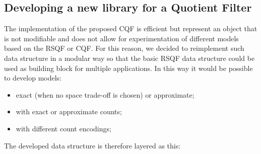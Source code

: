 \subsection{Developing a new library for a Quotient Filter}
The implementation of the proposed CQF is efficient but represent an object that is not modifiable and does not allow for experimentation of different models based on the RSQF or CQF.
For this reason, we decided to reimplement such data structure in a modular way so that the basic RSQF data structure could be used as building block for multiple applications. In this way it would be possible to develop models:
\begin{itemize}
	\item exact (when no space trade-off is chosen) or approximate;
	\item with exact or approximate counts;
	\item with different count encodings;
\end{itemize}
The developed data structure is therefore layered as this:
